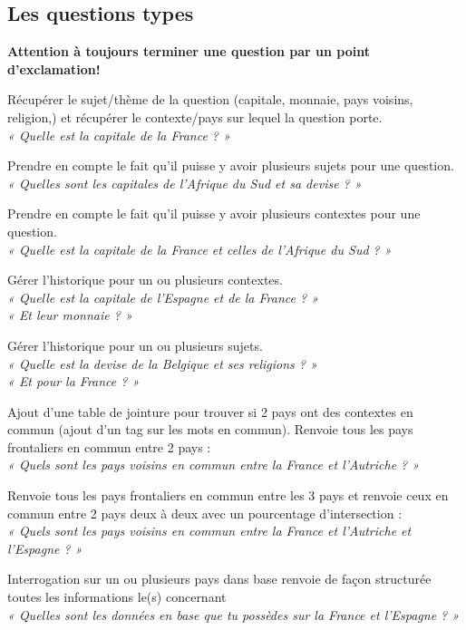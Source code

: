 \documentclass[11pt,a4paper]{article}
\begin{document}
\subsection{Les questions types}

\textbf{Attention à toujours terminer une question par un point d'exclamation!}


Récupérer le sujet/thème de la question (capitale, monnaie, pays voisins, religion,) et récupérer le contexte/pays sur lequel la question porte. \\
\textit{« Quelle est la capitale de la France ? » }

Prendre en compte le fait qu’il puisse y avoir plusieurs sujets pour une question. \\
\textit{« Quelles sont les capitales de l’Afrique du Sud et sa devise ? »}

Prendre en compte le fait qu’il puisse y avoir plusieurs contextes pour une question. \\
\textit{« Quelle est la capitale de la France et celles de l’Afrique du Sud ? »}

Gérer l’historique pour un ou plusieurs contextes. \\
\textit{« Quelle est la capitale de l’Espagne et de la France ? »\\
	« Et leur monnaie ? »}

Gérer l’historique pour un ou plusieurs sujets. \\
\textit{« Quelle est la devise de la Belgique et ses religions ? » \\
	« Et pour la France ? »}

Ajout d’une table de jointure pour trouver si 2 pays ont des contextes en commun (ajout d’un tag sur les mots en commun). Renvoie tous les pays frontaliers en commun entre 2 pays : \\
\textit{« Quels sont les pays voisins en commun entre la France et l’Autriche ? »}

Renvoie tous les pays frontaliers en commun entre les 3 pays et renvoie ceux en commun entre 2 pays deux à deux avec un pourcentage d’intersection : \\
\textit{« Quels sont les pays voisins en commun entre la France et l’Autriche et l’Espagne ? »}

Interrogation sur un ou plusieurs pays dans base renvoie de façon structurée toutes les informations le(s) concernant \\
\textit{« Quelles sont les données en base que tu possèdes sur la France et l’Espagne ? »}
\end{document}

